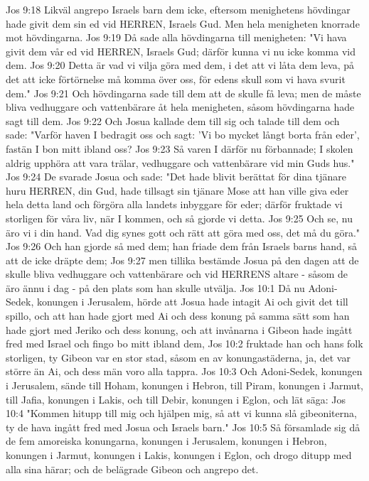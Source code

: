 Jos 9:18  Likväl angrepo Israels barn dem icke, eftersom menighetens hövdingar hade givit dem sin ed vid HERREN, Israels Gud. Men hela menigheten knorrade mot hövdingarna.
Jos 9:19  Då sade alla hövdingarna till menigheten: "Vi hava givit dem vår ed vid HERREN, Israels Gud; därför kunna vi nu icke komma vid dem.
Jos 9:20  Detta är vad vi vilja göra med dem, i det att vi låta dem leva, på det att icke förtörnelse må komma över oss, för edens skull som vi hava svurit dem."
Jos 9:21  Och hövdingarna sade till dem att de skulle få leva; men de måste bliva vedhuggare och vattenbärare åt hela menigheten, såsom hövdingarna hade sagt till dem.
Jos 9:22  Och Josua kallade dem till sig och talade till dem och sade: "Varför haven I bedragit oss och sagt: 'Vi bo mycket långt borta från eder', fastän I bon mitt ibland oss?
Jos 9:23  Så varen I därför nu förbannade; I skolen aldrig upphöra att vara trälar, vedhuggare och vattenbärare vid min Guds hus."
Jos 9:24  De svarade Josua och sade: "Det hade blivit berättat för dina tjänare huru HERREN, din Gud, hade tillsagt sin tjänare Mose att han ville giva eder hela detta land och förgöra alla landets inbyggare för eder; därför fruktade vi storligen för våra liv, när I kommen, och så gjorde vi detta.
Jos 9:25  Och se, nu äro vi i din hand. Vad dig synes gott och rätt att göra med oss, det må du göra."
Jos 9:26  Och han gjorde så med dem; han friade dem från Israels barns hand, så att de icke dräpte dem;
Jos 9:27  men tillika bestämde Josua på den dagen att de skulle bliva vedhuggare och vattenbärare och vid HERRENS altare - såsom de äro ännu i dag - på den plats som han skulle utvälja.
Jos 10:1  Då nu Adoni-Sedek, konungen i Jerusalem, hörde att Josua hade intagit Ai och givit det till spillo, och att han hade gjort med Ai och dess konung på samma sätt som han hade gjort med Jeriko och dess konung, och att invånarna i Gibeon hade ingått fred med Israel och fingo bo mitt ibland dem,
Jos 10:2  fruktade han och hans folk storligen, ty Gibeon var en stor stad, såsom en av konungastäderna, ja, det var större än Ai, och dess män voro alla tappra.
Jos 10:3  Och Adoni-Sedek, konungen i Jerusalem, sände till Hoham, konungen i Hebron, till Piram, konungen i Jarmut, till Jafia, konungen i Lakis, och till Debir, konungen i Eglon, och lät säga:
Jos 10:4  "Kommen hitupp till mig och hjälpen mig, så att vi kunna slå gibeoniterna, ty de hava ingått fred med Josua och Israels barn."
Jos 10:5  Så församlade sig då de fem amoreiska konungarna, konungen i Jerusalem, konungen i Hebron, konungen i Jarmut, konungen i Lakis, konungen i Eglon, och drogo ditupp med alla sina härar; och de belägrade Gibeon och angrepo det.

